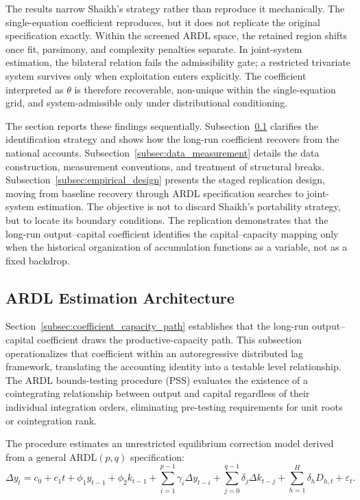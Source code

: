 \documentclass[11pt]{article}
\begin{document}
The results narrow Shaikh's strategy rather than reproduce it mechanically. The single-equation coefficient reproduces, but it does not replicate the original specification exactly. Within the screened ARDL space, the retained region shifts once fit, parsimony, and complexity penalties separate. In joint-system estimation, the bilateral relation fails the admissibility gate; a restricted trivariate system survives only when exploitation enters explicitly. The coefficient interpreted as $\theta$ is therefore recoverable, non-unique within the single-equation grid, and system-admissible only under distributional conditioning.

The section reports these findings sequentially. Subsection~\ref{subsec:shaikh_identification_strategy} clarifies the identification strategy and shows how the long-run coefficient recovers from the national accounts. Subsection~\ref{subsec:data_measurement} details the data construction, measurement conventions, and treatment of structural breaks. Subsection~\ref{subsec:empirical_design} presents the staged replication design, moving from baseline recovery through ARDL specification searches to joint-system estimation. The objective is not to discard Shaikh's portability strategy, but to locate its boundary conditions. The replication demonstrates that the long-run output--capital coefficient identifies the capital--capacity mapping only when the historical organization of accumulation functions as a variable, not as a fixed backdrop.

\subsection{ARDL Estimation Architecture}
\label{subsec:shaikh_identification_strategy}

Section~\ref{subsec:coefficient_capacity_path} establishes that the long-run output--capital coefficient draws the productive-capacity path. This subsection operationalizes that coefficient within an autoregressive distributed lag framework, translating the accounting identity into a testable level relationship. The ARDL bounds-testing procedure \citep{Pesaran2001} (PSS) evaluates the existence of a cointegrating relationship between output and capital regardless of their individual integration orders, eliminating pre-testing requirements for unit roots or cointegration rank.

The procedure estimates an unrestricted equilibrium correction model derived from a general $\text{ARDL}(p, q)$ specification:
\begin{equation}
\Delta y_t
= c_0 + c_1 t
+ \phi_1 y_{t-1}
+ \phi_2 k_{t-1}
+ \sum_{i=1}^{p-1} \gamma_i \Delta y_{t-i}
+ \sum_{j=0}^{q-1} \delta_j \Delta k_{t-j}
+ \sum_{h=1}^{H} \delta_h D_{h,t}
+ \varepsilon_t .
\label{eq:ardl_uecm}
\end{equation}
\end{document}
